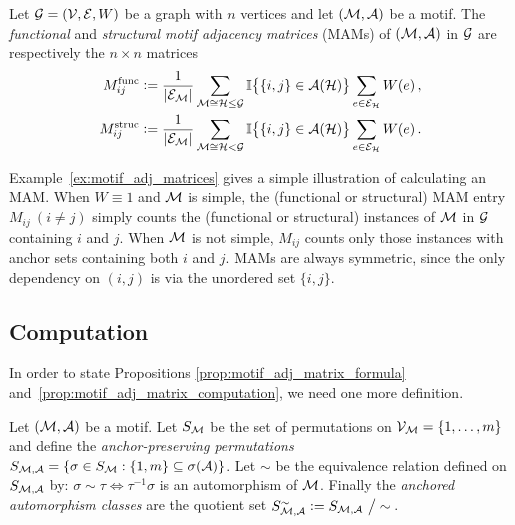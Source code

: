 \begin{definition} \label{def:motif_adj_matrices}
%
Let $\mathcal{G} = (\mathcal{V,E},W)$ be a graph with $n$ vertices and let $\mathcal{(M,A)}$ be a motif. The \emph{functional} and \emph{structural motif adjacency matrices} (MAMs) of $\mathcal{(M,A)}$ in $\mathcal{G}$ are respectively the $n \times n$ matrices
%
\begin{align*}
	M^\mathrm{func}_{ij} &\vcentcolon= \frac{1}{|\mathcal{E_M}|} \sum_{\mathcal{M} \cong \mathcal{H} \leq \mathcal{G}} \mathbb{I} \big\{ \{i,j\} \in \mathcal{A}(\mathcal{H}) \big\} \sum_{e \in \mathcal{E_H}} W(e)\,, \\
	M^\mathrm{struc}_{ij} &\vcentcolon= \frac{1}{|\mathcal{E_M}|} \sum_{\mathcal{M} \cong \mathcal{H} < \mathcal{G}} \mathbb{I} \big\{ \{i,j\} \in \mathcal{A}(\mathcal{H}) \big\} \sum_{e \in \mathcal{E_H}} W(e)\,.
\end{align*}
\end{definition}


\begin{remark}
Example~\ref{ex:motif_adj_matrices} gives a simple illustration of calculating an MAM.
When $W \equiv 1$ and $\mathcal{M}$ is simple, the (functional or structural) MAM entry $M_{ij} \ (i \neq j)$ simply counts the (functional or structural) instances of $\mathcal{M}$ in $\mathcal{G}$ containing $i$ and $j$.
When $\mathcal{M}$ is not simple, $M_{ij}$ counts only those instances with anchor sets containing both $i$ and $j$.
MAMs are always symmetric, since the only dependency on $(i,j)$ is via the unordered set $\{i,j\}$.
\end{remark}









\subsection{Computation} \label{sec:graphs_computation}

In order to state Propositions \ref{prop:motif_adj_matrix_formula} and~\ref{prop:motif_adj_matrix_computation}, we need one more definition.

\begin{definition}
Let $(\mathcal{M,A})$ be a motif.
Let $S_{\mathcal{M}}$ be the set of permutations on $ \mathcal{V_M} = \{ 1, \ldots, m \}$ and define the \emph{anchor-preserving permutations} $S_{\mathcal{M,A}} = \{ \sigma \in S_{\mathcal{M}} : \{1,m\} \subseteq \sigma(\mathcal{A}) \}$.
Let $\sim$ be the equivalence relation defined on $S_{\mathcal{M,A}}$ by: $\sigma \sim \tau \iff \tau^{-1} \sigma$ is an automorphism of $\mathcal{M}$.
Finally the \emph{anchored automorphism classes} are the quotient set $S_{\mathcal{M,A}}^\sim \vcentcolon= S_{\mathcal{M,A}} \ \big/ \sim$\,.
\end{definition}


